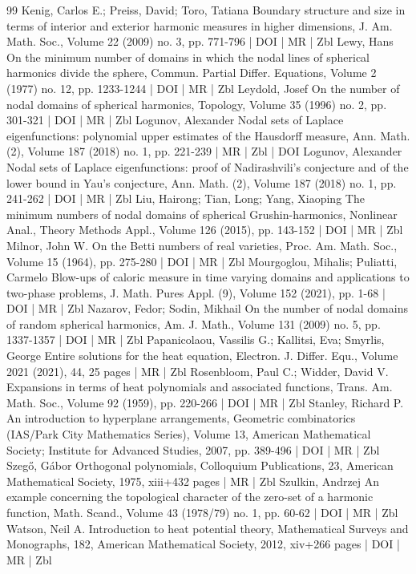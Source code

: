 \begin{thebibliography}{99}
Kenig, Carlos E.; Preiss, David; Toro, Tatiana Boundary structure and size in terms of interior and exterior harmonic measures in higher dimensions, J. Am. Math. Soc., Volume 22 (2009) no. 3, pp. 771-796 | DOI | MR | Zbl
Lewy, Hans On the minimum number of domains in which the nodal lines of spherical harmonics divide the sphere, Commun. Partial Differ. Equations, Volume 2 (1977) no. 12, pp. 1233-1244 | DOI | MR | Zbl
Leydold, Josef On the number of nodal domains of spherical harmonics, Topology, Volume 35 (1996) no. 2, pp. 301-321 | DOI | MR | Zbl
Logunov, Alexander Nodal sets of Laplace eigenfunctions: polynomial upper estimates of the Hausdorff measure, Ann. Math. (2), Volume 187 (2018) no. 1, pp. 221-239 | MR | Zbl | DOI
Logunov, Alexander Nodal sets of Laplace eigenfunctions: proof of Nadirashvili’s conjecture and of the lower bound in Yau’s conjecture, Ann. Math. (2), Volume 187 (2018) no. 1, pp. 241-262 | DOI | MR | Zbl
Liu, Hairong; Tian, Long; Yang, Xiaoping The minimum numbers of nodal domains of spherical Grushin-harmonics, Nonlinear Anal., Theory Methods Appl., Volume 126 (2015), pp. 143-152 | DOI | MR | Zbl
Milnor, John W. On the Betti numbers of real varieties, Proc. Am. Math. Soc., Volume 15 (1964), pp. 275-280 | DOI | MR | Zbl
Mourgoglou, Mihalis; Puliatti, Carmelo Blow-ups of caloric measure in time varying domains and applications to two-phase problems, J. Math. Pures Appl. (9), Volume 152 (2021), pp. 1-68 | DOI | MR | Zbl
Nazarov, Fedor; Sodin, Mikhail On the number of nodal domains of random spherical harmonics, Am. J. Math., Volume 131 (2009) no. 5, pp. 1337-1357 | DOI | MR | Zbl
Papanicolaou, Vassilis G.; Kallitsi, Eva; Smyrlis, George Entire solutions for the heat equation, Electron. J. Differ. Equ., Volume 2021 (2021), 44, 25 pages | MR | Zbl
Rosenbloom, Paul C.; Widder, David V. Expansions in terms of heat polynomials and associated functions, Trans. Am. Math. Soc., Volume 92 (1959), pp. 220-266 | DOI | MR | Zbl
Stanley, Richard P. An introduction to hyperplane arrangements, Geometric combinatorics (IAS/Park City Mathematics Series), Volume 13, American Mathematical Society; Institute for Advanced Studies, 2007, pp. 389-496 | DOI | MR | Zbl
Szegő, Gábor Orthogonal polynomials, Colloquium Publications, 23, American Mathematical Society, 1975, xiii+432 pages | MR | Zbl
Szulkin, Andrzej An example concerning the topological character of the zero-set of a harmonic function, Math. Scand., Volume 43 (1978/79) no. 1, pp. 60-62 | DOI | MR | Zbl
Watson, Neil A. Introduction to heat potential theory, Mathematical Surveys and Monographs, 182, American Mathematical Society, 2012, xiv+266 pages | DOI | MR | Zbl
\end{thebibliography}
